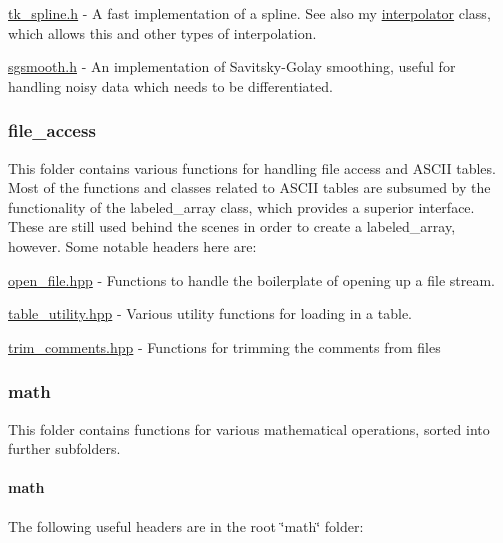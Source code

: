 \begin{DoxyItemize}
\item \hyperlink{tk__spline_8h}{tk\+\_\+spline.\+h} -\/ A fast implementation of a spline. See also my \hyperlink{interpolator_8h}{interpolator} class, which allows this and other types of interpolation.
\item \hyperlink{sgsmooth_8h}{sgsmooth.\+h} -\/ An implementation of Savitsky-\/\+Golay smoothing, useful for handling noisy data which needs to be differentiated.
\end{DoxyItemize}

\subsubsection*{file\+\_\+access}

This folder contains various functions for handling file access and A\+S\+C\+I\+I tables. Most of the functions and classes related to A\+S\+C\+I\+I tables are subsumed by the functionality of the labeled\+\_\+array class, which provides a superior interface. These are still used behind the scenes in order to create a labeled\+\_\+array, however. Some notable headers here are\+:


\begin{DoxyItemize}
\item \hyperlink{open__file_8hpp}{open\+\_\+file.\+hpp} -\/ Functions to handle the boilerplate of opening up a file stream.
\item \hyperlink{table__utility_8hpp}{table\+\_\+utility.\+hpp} -\/ Various utility functions for loading in a table.
\item \hyperlink{trim__comments_8hpp}{trim\+\_\+comments.\+hpp} -\/ Functions for trimming the comments from files
\end{DoxyItemize}

\subsubsection*{math}

This folder contains functions for various mathematical operations, sorted into further subfolders.

\paragraph*{math}

The following useful headers are in the root \char`\"{}math\char`\"{} folder\+:



